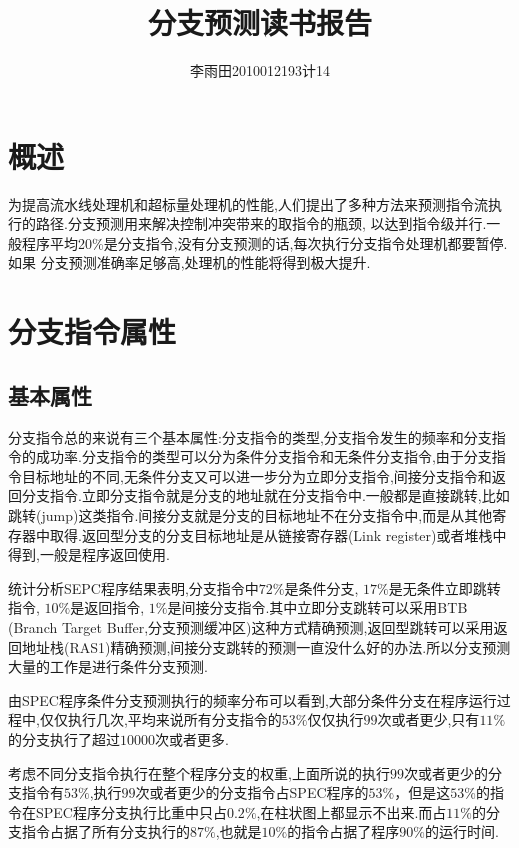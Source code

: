 \documentclass[adobefonts, nocap]{ctexart}
\begin{document}
  \title{分支预测读书报告}
  \author{李雨田\hspace{1em}2010012193\hspace{1em}计14}
  \maketitle
  \tableofcontents
  \section{概述}
    为提高流水线处理机和超标量处理机的性能,人们提出了多种方法来预测指令流执行的路径.分支预测用来解决控制冲突带来的取指令的瓶颈,
    以达到指令级并行.一般程序平均20\%是分支指令,没有分支预测的话,每次执行分支指令处理机都要暂停.如果
    分支预测准确率足够高,处理机的性能将得到极大提升.
  \section{分支指令属性}
    \subsection{基本属性}
      分支指令总的来说有三个基本属性:分支指令的类型,分支指令发生的频率和分支指令的成功率.分支指令的类型可以分为条件分支指令和无条件分支指令,由于分支指令目标地址的不同,无条件分支又可以进一步分为立即分支指令,间接分支指令和返回分支指令.立即分支指令就是分支的地址就在分支指令中.一般都是直接跳转,比如跳转(jump)这类指令.间接分支就是分支的目标地址不在分支指令中,而是从其他寄存器中取得.返回型分支的分支目标地址是从链接寄存器(Link register)或者堆栈中得到,一般是程序返回使用.

      统计分析SEPC程序结果表明,分支指令中$72\%$是条件分支, $17\%$是无条件立即跳转指令, $10\%$是返回指令, $1\%$是间接分支指令.其中立即分支跳转可以采用BTB (Branch Target Buffer,分支预测缓冲区)这种方式精确预测,返回型跳转可以采用返回地址栈(RAS1)精确预测,间接分支跳转的预测一直没什么好的办法.所以分支预测大量的工作是进行条件分支预测.

      由SPEC程序条件分支预测执行的频率分布可以看到,大部分条件分支在程序运行过程中,仅仅执行几次,平均来说所有分支指令的$53\%$仅仅执行$99$次或者更少,只有$11\%$的分支执行了超过$10000$次或者更多.

      考虑不同分支指令执行在整个程序分支的权重,上面所说的执行$99$次或者更少的分支指令有$53\%$,执行$99$次或者更少的分支指令占SPEC程序的$53\%$，但是这$53\%$的指令在SPEC程序分支执行比重中只占$0.2\%$,在柱状图上都显示不出来.而占$11\%$的分支指令占据了所有分支执行的$87\%$,也就是$10\%$的指令占据了程序$90\%$的运行时间.
\end{document}
